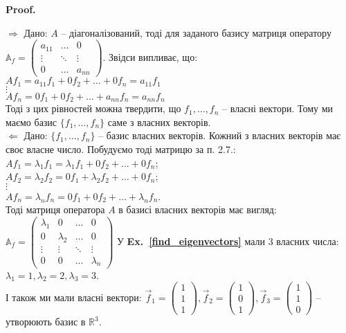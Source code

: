 \documentclass[a4paper, 10pt]{article}
\makeatletter
\def\rightproof{$\boxed{\Rightarrow}$ }
\def\leftproof{$\boxed{\Leftarrow}$ }
\theoremstyle{theoremdd}
\newcommand\exref[1]{\textbf{Ex.~\ref{#1}}}
\renewenvironment{proof}[1][Proof.\\]{\par
\pushQED{\hfill \qed}%
\normalfont \topsep6\p@\@plus6\p@\relax
\trivlist
\item\relax
{\bfseries
#1\@addpunct{.}}\hspace\labelsep\ignorespaces
}{%
\popQED\endtrivlist\@endpefalse
}
\makeatother
\begin{document}
\begin{proof}
\rightproof Дано: $A$ -- діагоналізований, тоді для заданого базису матриця оператору $\mathbb{A}_f = \begin{pmatrix}
a_{11} & \dots & 0 \\
\vdots & \ddots & \vdots \\
0 & \dots & a_{nn}
\end{pmatrix}$. Звідси випливає, що:\\
$Af_1 = a_{11}f_1 + 0f_2 + \dots + 0f_n = a_{11}f_1$\\
$\vdots$\\
$Af_n = 0f_1 + 0f_2 + \dots + a_{nn}f_n = a_{nn}f_n$\\
Тоді з цих рівностей можна твердити, що $f_1,\dots,f_n$ -- власні вектори. Тому ми маємо базис $\{f_1,\dots,f_n\}$ саме з власних векторів.
\bigskip \\
\leftproof Дано: $\{f_1,\dots,f_n\}$ -- базис власних векторів. Кожний з власних векторів має своє власне число. Побудуємо тоді матрицю за п. 2.7.:\\
$Af_1 = \lambda_1 f_1 = \lambda_1 f_1 + 0 f_2 + \dots + 0 f_n$;\\
$Af_2 = \lambda_2 f_2 = 0 f_1 + \lambda_2 f_2 + \dots + 0 f_n$;\\
$\vdots$\\
$Af_n = \lambda_n f_n = 0 f_1 + 0 f_2 + \dots + \lambda_n f_n$.\\
Тоді матриця оператора $A$ в базисі власних векторів має вигляд:\\
$\mathbb{A}_f = \begin{pmatrix}
\lambda_1 & 0 & \dots & 0 \\
0 & \lambda_2 & \dots & 0 \\
\vdots & \vdots & \ddots & \vdots \\
0 & 0 & \dots & \lambda_n
\end{pmatrix}$
\end{proof}
\noindent
У \exref{find_eigenvectors} мали 3 власних числа: $\lambda_1 = 1, \lambda_2 = 2,\lambda_3 = 3$.\\
І також ми мали власні вектори: $\vec{f}_1 = \begin{pmatrix}
1 \\ 1 \\ 1
\end{pmatrix}, \vec{f}_2 = \begin{pmatrix}
1 \\ 0 \\ 1
\end{pmatrix}, \vec{f}_3 = \begin{pmatrix}
1 \\ 1 \\ 0
\end{pmatrix}$ -- утворюють базис в $\mathbb{R}^3$.\\
\end{document}
